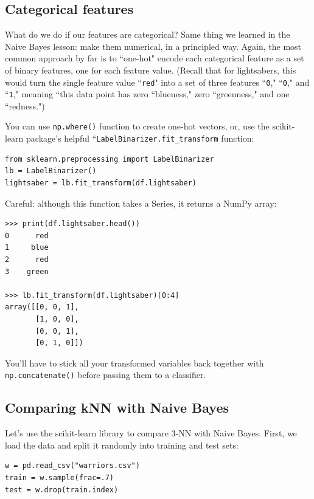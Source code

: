\documentclass[12pt]{article}
\begin{document}
\subsection{Categorical features}

What do we do if our features are categorical? Same thing we learned in the
Naive Bayes lesson: make them numerical, in a principled way. Again, the most
common approach by far is to ``one-hot" encode each categorical feature as a
set of binary features, one for each feature value. (Recall that for
lightsabers, this would turn the single feature value ``\texttt{red}" into a
set of three features ``\texttt{0}," ``\texttt{0}," and ``\texttt{1}," meaning
``this data point has zero ``blueness," zero ``greenness," and one
``redness.")

You can use \texttt{np.where()} function to create one-hot vectors, or, use
the scikit-learn package's helpful ``\texttt{LabelBinarizer.fit\_transform}
function:

\small
\begin{Verbatim}[fontsize=\small,samepage=true,frame=none]
from sklearn.preprocessing import LabelBinarizer
lb = LabelBinarizer()
lightsaber = lb.fit_transform(df.lightsaber)
\end{Verbatim}
\normalsize

Careful: although this function takes a Series, it returns a NumPy array:

\small
\begin{Verbatim}[fontsize=\small,samepage=true,frame=none]
>>> print(df.lightsaber.head())
0      red
1     blue
2      red
3    green

>>> lb.fit_transform(df.lightsaber)[0:4]
array([[0, 0, 1],
       [1, 0, 0],
       [0, 0, 1],
       [0, 1, 0]])
\end{Verbatim}
\normalsize

You'll have to stick all your transformed variables back together with
\texttt{np.concatenate()} before passing them to a classifier.

\subsection{Comparing kNN with Naive Bayes}

Let's use the scikit-learn library to compare 3-NN with Naive Bayes. First, we
load the data and split it randomly into training and test sets:

\small
\begin{Verbatim}[fontsize=\small,samepage=true,frame=none]
w = pd.read_csv("warriors.csv")
train = w.sample(frac=.7)
test = w.drop(train.index)
\end{Verbatim}
\normalsize
\end{document}
